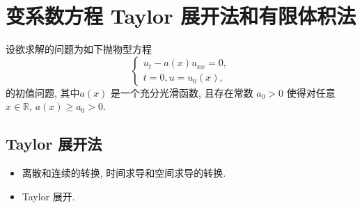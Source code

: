 \section{变系数方程 Taylor 展开法和有限体积法}

设欲求解的问题为如下抛物型方程
\begin{equation}\label{eq:variable-coeff-parabolic}
    \begin{cases}
        u_t - a(x)u_{xx} = 0, \\
        t=0,u=u_0(x),
    \end{cases}
\end{equation}
的初值问题, 其中$a(x)$ 是一个充分光滑函数, 且存在常数 $a_0 > 0$ 使得对任意 $x \in \mathbb{R}$, $a(x) \geq a_0 > 0$.

\subsection{Taylor 展开法}


\begin{note}[Taylor展开法核心思想]
\begin{itemize}
    \item 离散和连续的转换, 时间求导和空间求导的转换.
    \item Taylor 展开.
\end{itemize}
\end{note}

